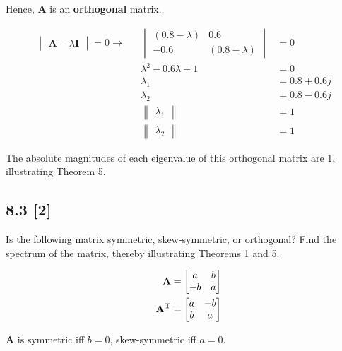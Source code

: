 \documentclass{article}
\begin{document}
Hence, \textbf{A} is an \textbf{orthogonal} matrix.

\begin{align}
    \label{eq:6}
    \begin{vmatrix}
    \textbf{A} - \lambda\textbf{I}
    \end{vmatrix} = 0 \rightarrow && \begin{vmatrix}
    (0.8-\lambda) & 0.6\\
    -0.6 & (0.8 - \lambda)
    \end{vmatrix} &= 0
    \\
    \label{eq:7}
    && \lambda^2 -0.6\lambda +1 &= 0
    \\
    \label{eq:8}
    && \lambda_1 &= 0.8 + 0.6j
    \\
    \label{eq:9}
    && \lambda_2 &= 0.8 - 0.6j
    \\
    \label{eq:10}
    && \begin{Vmatrix} \lambda_1 \end{Vmatrix} &= 1
    \\
    \label{eq:11}
    && \begin{Vmatrix} \lambda_2 \end{Vmatrix} &= 1
\end{align}

The absolute magnitudes of each eigenvalue of this orthogonal matrix are 1, illustrating Theorem 5.

\subsection*{8.3 [2]}
\setcounter{equation}{0}

Is the following matrix symmetric, skew-symmetric, or orthogonal?  Find the spectrum of the matrix, thereby illustrating Theorems 1 and 5.

\begin{align}
    \label{eq:1}
    && \textbf{A} &= \begin{bmatrix}
        a & b\\
        -b & a
    \end{bmatrix}
    \\
    \label{eq:2}
    && \textbf{A\textsuperscript{T}} &= \begin{bmatrix}
    a & -b\\
    b & a
    \end{bmatrix}
\end{align}

\textbf{A} is symmetric iff $b = 0$, skew-symmetric iff $a = 0$.
\end{document}
